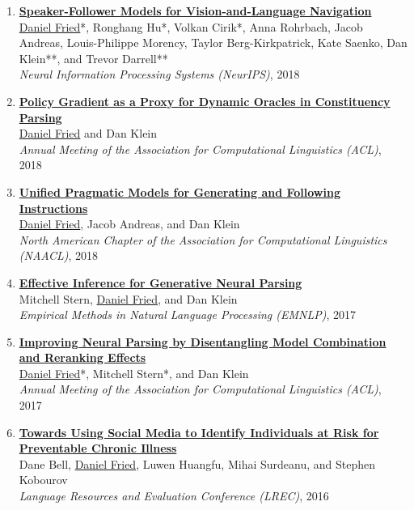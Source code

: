 \begin{enumerate}[leftmargin=-1mm,partopsep=0pt]
\item \href{https://arxiv.org/abs/1806.02724}{\textbf{Speaker-Follower Models for Vision-and-Language Navigation}} \\
  \underline{Daniel Fried}*, Ronghang Hu*, Volkan Cirik*, Anna Rohrbach, Jacob Andreas, Louis-Philippe Morency, Taylor Berg-Kirkpatrick, Kate Saenko, Dan Klein**, and Trevor Darrell** \\
  \emph{Neural Information Processing Systems (NeurIPS)}, 2018

\item \href{https://arxiv.org/abs/1806.03290}{\textbf{Policy Gradient as a Proxy for Dynamic Oracles in Constituency Parsing}} \\
  \underline{Daniel Fried} and Dan Klein\\
  \emph{Annual Meeting of the Association for Computational Linguistics (ACL)}, 2018

\item \href{https://arxiv.org/abs/1711.04987}{\textbf{Unified Pragmatic Models for Generating and Following Instructions}} \\
  \underline{Daniel Fried}, Jacob Andreas, and Dan Klein\\
  \emph{North American Chapter of the Association for Computational Linguistics (NAACL)}, 2018

\item \href{http://arxiv.org/abs/1707.08976}{\textbf{Effective Inference for Generative Neural Parsing}} \\
  Mitchell Stern, \underline{Daniel Fried}, and Dan Klein\\
  \emph{Empirical Methods in Natural Language Processing (EMNLP)}, 2017

\item \href{https://arxiv.org/abs/1707.03058}{\textbf{Improving Neural Parsing by Disentangling Model Combination and Reranking Effects}} \\
  \underline{Daniel Fried}*, Mitchell Stern*, and Dan Klein\\
  \emph{Annual Meeting of the Association for Computational Linguistics (ACL)}, 2017

\item \href{http://arxiv.org/abs/1603.03784}{\textbf{Towards Using Social Media to Identify Individuals at Risk for Preventable Chronic Illness}} \\
  Dane Bell, \underline{Daniel Fried}, Luwen Huangfu, Mihai Surdeanu, and Stephen Kobourov\\
  \emph{Language Resources and Evaluation Conference (LREC)}, 2016


\end{enumerate}
